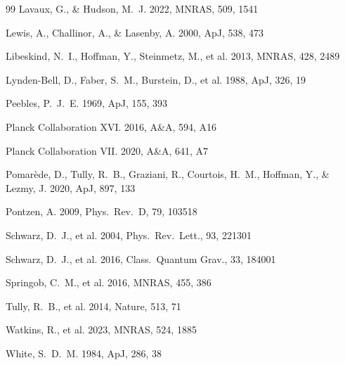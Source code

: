\documentclass[12pt]{article}
\begin{document}
\begin{thebibliography}{99}
Lavaux, G., \& Hudson, M.~J. 2022, MNRAS, 509, 1541

Lewis, A., Challinor, A., \& Lasenby, A. 2000, ApJ, 538, 473

Libeskind, N.~I., Hoffman, Y., Steinmetz, M., et al. 2013, MNRAS, 428, 2489

Lynden-Bell, D., Faber, S.~M., Burstein, D., et al. 1988, ApJ, 326, 19

Peebles, P.~J.~E. 1969, ApJ, 155, 393

Planck Collaboration XVI. 2016, A\&A, 594, A16

Planck Collaboration VII. 2020, A\&A, 641, A7

Pomarède, D., Tully, R.~B., Graziani, R., Courtois, H.~M., Hoffman, Y., \& Lezmy, J. 2020, ApJ, 897, 133

Pontzen, A. 2009, Phys.\ Rev.\ D, 79, 103518

Schwarz, D.~J., et al. 2004, Phys.\ Rev.\ Lett., 93, 221301

Schwarz, D.~J., et al. 2016, Class.\ Quantum Grav., 33, 184001

Springob, C.~M., et al. 2016, MNRAS, 455, 386

Tully, R.~B., et al. 2014, Nature, 513, 71

Watkins, R., et al. 2023, MNRAS, 524, 1885

White, S.~D.~M. 1984, ApJ, 286, 38

\end{thebibliography}
\end{document}
